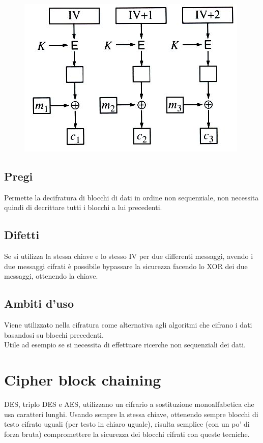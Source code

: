 \begin{figure}[H]
\centering
\includegraphics[scale=0.6]{res/img/54_CMC.png}
\end{figure}

\subsection{Pregi}
Permette la decifratura di blocchi di dati in ordine non sequenziale, non necessita quindi di decrittare tutti i blocchi a lui precedenti.

\subsection{Difetti}
Se si utilizza la stessa chiave e lo stesso IV per due differenti messaggi, avendo i due messaggi cifrati è possibile bypassare la sicurezza facendo lo XOR dei due messaggi, ottenendo la chiave.

\subsection{Ambiti d'uso}
Viene utilizzato nella cifratura come alternativa agli algoritmi che cifrano i dati basandosi su blocchi precedenti.\\
Utile ad esempio se si necessita di effettuare ricerche non sequenziali dei dati.

\section{Cipher block chaining}

DES, triplo DES e AES, utilizzano un cifrario a sostituzione monoalfabetica che usa caratteri lunghi. Usando sempre la stessa chiave, ottenendo sempre blocchi di testo cifrato uguali (per testo in chiaro uguale), risulta semplice (con un po' di forza bruta) compromettere la sicurezza dei blocchi cifrati con queste tecniche.
